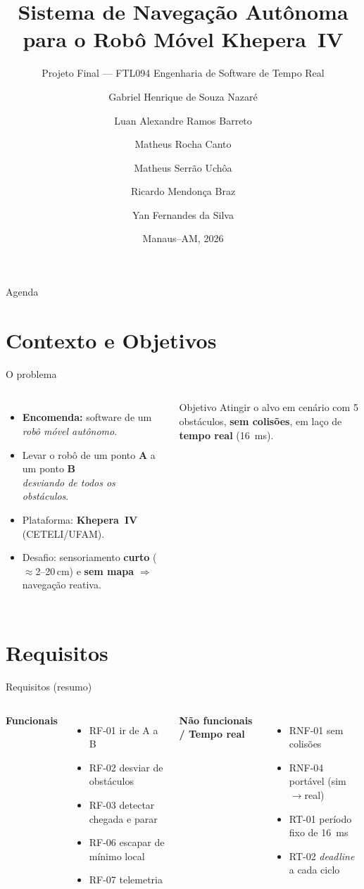 \documentclass[aspectratio=169,11pt]{beamer}
\title[Navegação Autônoma --- Khepera IV]{Sistema de Navegação Autônoma para o Robô Móvel Khepera~IV}
\subtitle{Projeto Final --- FTL094 Engenharia de Software de Tempo Real}
\author[Equipe FTL094]{\small Gabriel Henrique de Souza Nazaré \and Luan Alexandre Ramos Barreto \and Matheus Rocha Canto \and Matheus Serrão Uchôa \and Ricardo Mendonça Braz \and Yan Fernandes da Silva}
\institute[UFAM/CETELI]{PPGEE --- CETELI --- Universidade Federal do Amazonas}
\date{Manaus--AM, 2026}
\begin{document}
\begin{frame}\titlepage\end{frame}

\begin{frame}{Agenda}\tableofcontents\end{frame}

\section{Contexto e Objetivos}
\begin{frame}{O problema}
\begin{columns}
\begin{itemize}
  \item \textbf{Encomenda:} software de um \emph{robô móvel autônomo}.
  \item Levar o robô de um ponto \textbf{A} a um ponto \textbf{B}\\ \emph{desviando de todos os obstáculos}.
  \item Plataforma: \textbf{Khepera~IV} (CETELI/UFAM).
  \item Desafio: sensoriamento \textbf{curto} ($\approx$2--20\,cm) e \textbf{sem mapa} $\Rightarrow$ navegação reativa.
\end{itemize}
\begin{block}{Objetivo}
Atingir o alvo em cenário com 5 obstáculos, \textbf{sem colisões}, em laço de \textbf{tempo real} (16~ms).
\end{block}
\end{columns}
\end{frame}

\section{Requisitos}
\begin{frame}{Requisitos (resumo)}
\begin{columns}[T]
\textbf{Funcionais}
\begin{itemize}\small
  \item RF-01 ir de A a B
  \item RF-02 desviar de obstáculos
  \item RF-03 detectar chegada e parar
  \item RF-06 escapar de mínimo local
  \item RF-07 telemetria
\end{itemize}
\textbf{Não funcionais / Tempo real}
\begin{itemize}\small
  \item RNF-01 sem colisões
  \item RNF-04 portável (sim$\to$real)
  \item RT-01 período fixo de 16~ms
  \item RT-02 \emph{deadline} a cada ciclo
\end{itemize}
\end{columns}
\end{frame}
\end{document}
